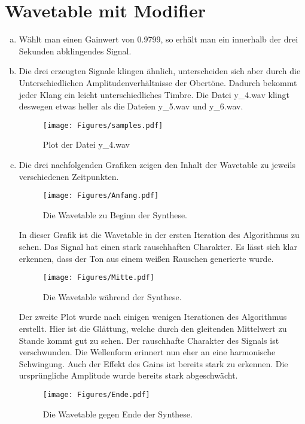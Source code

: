 \chapter{Wavetable mit Modifier}


\begin{enumerate}[a)]
\item
Wählt man einen Gainwert von 0.9799, so erhält man ein innerhalb der drei Sekunden abklingendes Signal.
\item
Die drei erzeugten Signale klingen ähnlich, unterscheiden sich aber durch die Unterschiedlichen Amplitudenverhältnisse der Obertöne. Dadurch bekommt jeder Klang ein leicht unterschiedliches Timbre. Die Datei y\_4.wav klingt deswegen etwas heller als die Dateien y\_5.wav und y\_6.wav.
\begin{figure}[H]
    \center
    \texttt{[image: Figures/samples.pdf]}
    \caption{Plot der Datei y\_4.wav}
    \label{fig:bs0}
\end{figure}
\item
Die drei nachfolgenden Grafiken zeigen den Inhalt der Wavetable zu jeweils verschiedenen Zeitpunkten.

\begin{figure}[H]
    \center
    \texttt{[image: Figures/Anfang.pdf]}
    \caption{Die Wavetable zu Beginn der Synthese.}
    \label{fig:bs1}
\end{figure}

In dieser Grafik ist die Wavetable in der ersten Iteration des Algorithmus zu sehen.
Das Signal hat einen stark rauschhaften Charakter.
Es lässt sich klar erkennen, dass der Ton aus einem weißen Rauschen generierte wurde. 

\begin{figure}[H]
    \center
    \texttt{[image: Figures/Mitte.pdf]}
    \caption{Die Wavetable während der Synthese.}
    \label{fig:bs1}
\end{figure}

Der zweite Plot wurde nach einigen wenigen Iterationen des Algorithmus erstellt.
Hier ist die Glättung, welche durch den gleitenden Mittelwert zu Stande kommt gut zu sehen.
Der rauschhafte Charakter des Signals ist verschwunden.
Die Wellenform erinnert nun eher an eine harmonische Schwingung.
Auch der Effekt des Gains ist bereits stark zu erkennen.
Die ursprüngliche Amplitude wurde bereits stark abgeschwächt.

\begin{figure}[H]
    \center
    \texttt{[image: Figures/Ende.pdf]}
    \caption{Die Wavetable gegen Ende der Synthese.}
    \label{fig:bs1}
\end{figure}


\end{enumerate}
